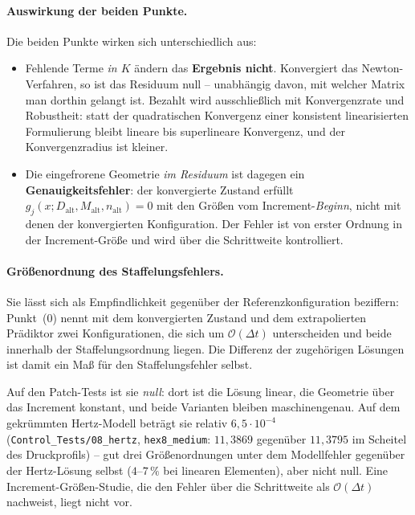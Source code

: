 \documentclass[a4paper,11pt]{article}
\def\bm#1{#1}%
\def\tilde#1{#1}%
\newcommand{\code}[1]{\texttt{\small #1}}
\newcommand{\file}[1]{\texttt{\small #1}}
\begin{document}
\paragraph{Auswirkung der beiden Punkte.} Die beiden Punkte wirken sich unterschiedlich aus:
\begin{itemize}\itemsep2pt
  \item Fehlende Terme \emph{in $\bm K$} ändern das \textbf{Ergebnis nicht}. Konvergiert das
        Newton-Verfahren, so ist das Residuum null -- unabhängig davon, mit welcher Matrix man
        dorthin gelangt ist. Bezahlt wird ausschließlich mit Konvergenzrate und Robustheit:
        statt der quadratischen Konvergenz einer konsistent linearisierten Formulierung bleibt
        lineare bis superlineare Konvergenz, und der Konvergenzradius ist kleiner.
  \item Die eingefrorene Geometrie \emph{im Residuum} ist dagegen ein
        \textbf{Genauigkeitsfehler}: der konvergierte Zustand erfüllt
        $\tilde g_j(\bm x;\bm D_{\text{alt}},\bm M_{\text{alt}},\bm n_{\text{alt}})=0$ mit den
        Größen vom Increment-\emph{Beginn}, nicht mit denen der konvergierten Konfiguration.
        Der Fehler ist von erster Ordnung in der Increment-Größe und wird über die Schrittweite
        kontrolliert.
\end{itemize}

\paragraph{Größenordnung des Staffelungsfehlers.} Sie lässt sich als Empfindlichkeit gegenüber der
Referenzkonfiguration beziffern: Punkt~(0) nennt mit dem konvergierten Zustand und dem
extrapolierten Prädiktor zwei Konfigurationen, die sich um $\mathcal O(\Delta t)$ unterscheiden
und beide innerhalb der Staffelungsordnung liegen. Die Differenz der zugehörigen Lösungen ist
damit ein Maß für den Staffelungsfehler selbst.

Auf den Patch-Tests ist sie \emph{null}: dort ist die Lösung linear, die Geometrie über das
Increment konstant, und beide Varianten bleiben maschinengenau. Auf dem gekrümmten Hertz-Modell
beträgt sie relativ $6{,}5\cdot10^{-4}$ (\file{Control\_Tests/08\_hertz}, \code{hex8\_medium}:
$11{,}3869$ gegenüber $11{,}3795$ im Scheitel des Druckprofils) -- gut drei Größenordnungen unter
dem Modellfehler gegenüber der Hertz-Lösung selbst ($4$--$7\,\%$ bei linearen Elementen), aber
nicht null. Eine Increment-Größen-Studie, die den Fehler über die Schrittweite als
$\mathcal O(\Delta t)$ nachweist, liegt nicht vor.
\end{document}
